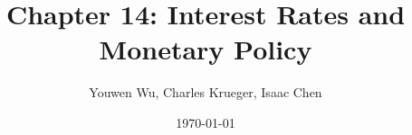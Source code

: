 



\title{Chapter 14: Interest Rates and Monetary Policy}
\author{Youwen Wu, Charles Krueger, Isaac Chen}
\date{\today}
\maketitle

